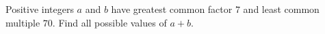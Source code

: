 Positive integers $a$ and $b$ have greatest common factor $7$ and least common multiple $70$. Find all possible values of $a+b$.
